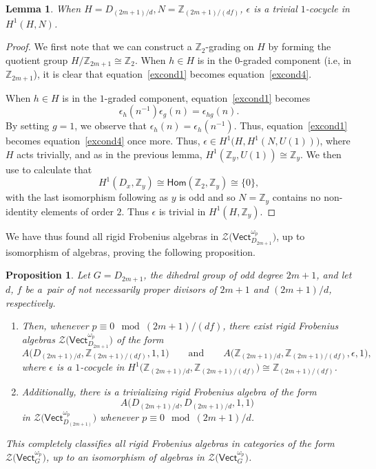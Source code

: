 \documentclass[pdftex]{sigma}
\numberwithin{equation}{section}
\newtheorem{Lemma}[Theorem]{Lemma}
\newtheorem{Proposition}[Theorem]{Proposition}
 { \theoremstyle{definition}
\newtheorem{Definition}[Theorem]{Definition}
\newtheorem{Note}[Theorem]{Note}
\newtheorem{Notation}[Theorem]{Notation}
\newtheorem{Example}[Theorem]{Example}
\newtheorem{Remark}[Theorem]{Remark} }
\newcommand{\Hom}{\mathsf{Hom}}
\newcommand{\Vect}{\mathsf{Vect}}
\newcommand{\mZ}{\mathbb{Z}}
\newcommand{\cZ}{\mathcal{Z}}
\begin{document}
\begin{Lemma}
 When $H=D_{(2m+1)/d},N=\mZ_{(2m+1)/(df)}$, $\epsilon$ is a trivial $1$-cocycle in $H^1(H,N)$.
\end{Lemma}
\begin{proof}
We first note that we can construct a $\mZ_2$-grading on $H$ by forming the quotient group $H/\mZ_{2m+1}\cong \mZ_2$. When $h\in H$ is in the $0$-graded component (i.e, in $\mZ_{2m+1}$), it is clear that equation~\eqref{excond1} becomes equation~\eqref{excond4}.

When $h \in H$ is in the $1$-graded component, equation~\eqref{excond1} becomes \[\epsilon_h(n^{-1})\epsilon_g(n) = \epsilon_{hg}(n).\]
By setting $g=1$, we observe that $\epsilon_h(n)=\epsilon_h(n^{-1})$. Thus, equation~\eqref{excond1} becomes equation~\eqref{excond4} once more. Thus, $\epsilon \in H^1\big(H,H^1(N,U(1))\big)$, where $H$ acts trivially, and as in the previous lemma, $H^1(\mZ_y,U(1)) \cong \mZ_y$. We then use \cite[Theorem~3.6.5, Corollary~3.3.11, Example~6.8.5]{Wei} to calculate that
\[H^1(D_x,\mZ_y)\cong \Hom(\mZ_2,\mZ_y) \cong \lbrace 0 \rbrace,\]
with the last isomorphism following as $y$ is odd and so $N=\mZ_y$ contains no non-identity elements of order $2$. Thus $\epsilon$ is trivial in $H^1(H,\mZ_y)$.
\end{proof}

We have thus found all rigid Frobenius algebras in $\cZ\big(\Vect_{D_{2m+1}}^{\omega_p}\big)$, up to isomorphism of algebras, proving the following proposition.

\begin{Proposition}
 Let $G=D_{2m+1}$, the dihedral group of odd degree $2m+1$, and let $d$, $f$ be a~pair of not necessarily proper divisors of $2m+1$ and $(2m+1)/d$, respectively.
 \begin{enumerate}\itemsep=0pt
 \item[$(a)$]
 Then, whenever $p\equiv 0 \mod (2m+1)/(df)$, there exist rigid Frobenius algebras $\cZ\big(\Vect_{D_{2m+1}}^{\omega_p}\big)$ of the form
 \[A\big(D_{(2m+1)/d},\mZ_{(2m+1)/(df)},1,1\big)\qquad \text{and}\qquad
A\big(\mZ_{(2m+1)/d},\mZ_{(2m+1)/(df)},\epsilon,1\big),\]
 where $\epsilon$ is a $1$-cocycle in $ H^1\big(\mZ_{(2m+1)/d}, \mZ_{(2m+1)/(df)}\big)\cong \mZ_{(2m+1)/(df)}$.
 \item[$(b)$] Additionally, there is a trivializing rigid Frobenius algebra of the form
 \[A\big(D_{(2m+1)/d},D_{(2m+1)/d},1,1\big)\]
 in $\cZ\big(\Vect_{D_{(2m+1)}}^{\omega_p}\big)$ whenever $p\equiv 0 \mod (2m+1)/d$.
 \end{enumerate}
This completely classifies all rigid Frobenius algebras in categories of the form $\cZ\big(\Vect_G^{\omega_p}\big)$, up to an isomorphism of algebras in $\cZ\big(\Vect_G^{\omega_p}\big)$.
\end{Proposition}
\end{document}
